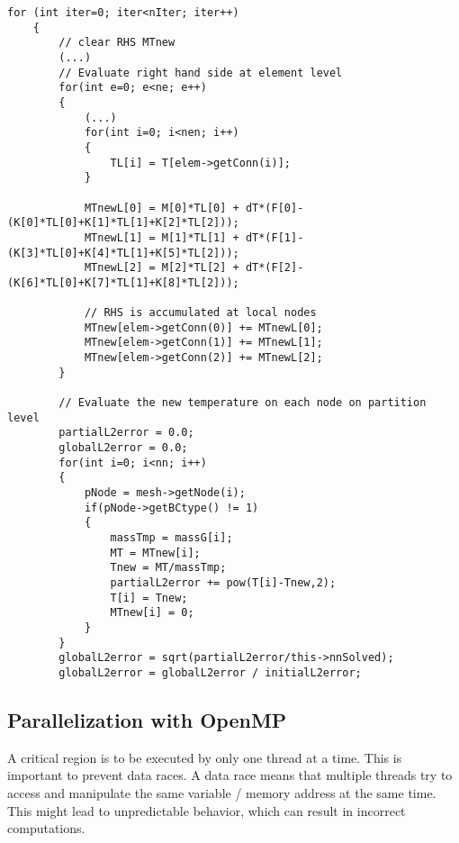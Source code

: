 \begin{lstlisting}[caption={\label{Code:Serial2} Explicit Solver}]
	for (int iter=0; iter<nIter; iter++)
	{
		// clear RHS MTnew
		(...)
		// Evaluate right hand side at element level
		for(int e=0; e<ne; e++)
		{
			(...)
			for(int i=0; i<nen; i++)
			{
				TL[i] = T[elem->getConn(i)];
			}
			
			MTnewL[0] = M[0]*TL[0] + dT*(F[0]-(K[0]*TL[0]+K[1]*TL[1]+K[2]*TL[2]));
			MTnewL[1] = M[1]*TL[1] + dT*(F[1]-(K[3]*TL[0]+K[4]*TL[1]+K[5]*TL[2]));
			MTnewL[2] = M[2]*TL[2] + dT*(F[2]-(K[6]*TL[0]+K[7]*TL[1]+K[8]*TL[2]));
			
			// RHS is accumulated at local nodes
			MTnew[elem->getConn(0)] += MTnewL[0];
			MTnew[elem->getConn(1)] += MTnewL[1];
			MTnew[elem->getConn(2)] += MTnewL[2];
		}
		
		// Evaluate the new temperature on each node on partition level
		partialL2error = 0.0;
		globalL2error = 0.0;
		for(int i=0; i<nn; i++)
		{
			pNode = mesh->getNode(i);
			if(pNode->getBCtype() != 1)
			{
				massTmp = massG[i];
				MT = MTnew[i];
				Tnew = MT/massTmp;
				partialL2error += pow(T[i]-Tnew,2);
				T[i] = Tnew;
				MTnew[i] = 0;
			}
		}
		globalL2error = sqrt(partialL2error/this->nnSolved);
		globalL2error = globalL2error / initialL2error;
\end{lstlisting}

\subsection{Parallelization with OpenMP}

A critical region is to be executed by only one thread at a time. This is important to prevent data races. A data race means that multiple threads try to access and manipulate the same variable / memory address at the same time. This might lead to unpredictable behavior, which can result in incorrect computations. 

